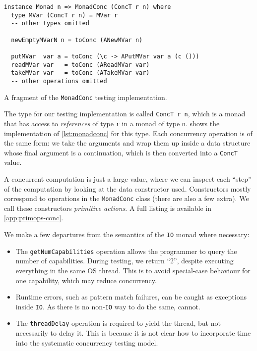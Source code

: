 \begin{listing}
  \begin{verbatim}
instance Monad n => MonadConc (ConcT r n) where
  type MVar (ConcT r n) = MVar r
  -- other types omitted

  newEmptyMVarN n = toConc (ANewMVar n)

  putMVar  var a = toConc (\c -> APutMVar var a (c ()))
  readMVar var   = toConc (AReadMVar var)
  takeMVar var   = toConc (ATakeMVar var)
  -- other operations omitted
  \end{verbatim}
  \caption{A fragment of the \texttt{MonadConc} testing implementation.}\label{lst:mvarops}
\end{listing}

The type for our testing implementation is called \verb|ConcT r n|, which is a
monad that has access to \emph{references} of type \verb|r| in a monad of type
\verb|n|.   shows the implementation of \cref{lst:monadconc} for
this type.  Each concurrency operation is of the same form: we take the
arguments and wrap them up inside a data structure whose final argument is a
continuation, which is then converted into a \verb|ConcT| value.

A concurrent computation is just a large value, where we can inspect each
``step'' of the computation by looking at the data constructor used.
Constructors mostly correspond to operations in the \verb|MonadConc| class
(there are also a few extra).  We call these constructors \emph{primitive
  actions}.  A full listing is available in \cref{app:primops-conc}.

We make a few departures from the semantics of the \verb|IO| monad where
necessary:

\begin{itemize}
\item The \verb|getNumCapabilities| operation allows the programmer to query the
  number of capabilities.  During testing, we return ``2'', despite executing
  everything in the same OS thread.  This is to avoid special-case behaviour for
  one capability, which may reduce concurrency.
\item Runtime errors, such as pattern match failures, can be caught as
  exceptions inside \verb|IO|.  As there is no non-\verb|IO| way to do the same,
  \dejafu{} cannot.
\item The \verb|threadDelay| operation is required to yield the thread, but not
  necessarily to delay it.  This is because it is not clear how to incorporate
  time into the systematic concurrency testing model.
\end{itemize}

